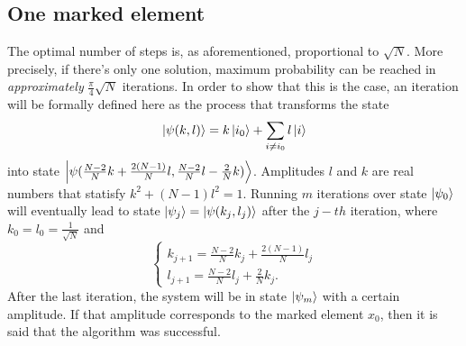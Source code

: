 \documentclass[../../dissertation.tex]{subfiles}
\begin{document}
\subsection{One marked element}
The optimal number of steps is, as aforementioned, proportional to $\sqrt{N}$.
More precisely, if there's only one solution, maximum probability can be
reached in \textit{approximately} $\frac{\pi}{4}\sqrt{N}$ iterations. In order
to show that this is the case, an iteration will be formally defined here as
the process that transforms the state
\begin{equation}
	\ket{\psi(k,l)} = k\ket{i_0} + \sum_{i\neq i_0}l\ket{i}
	\label{eq:groverQuantumRegister}
\end{equation}
into state $\ket{\psi(\frac{N-2}{N}k + \frac{2(N-1)}{N}l, \frac{N-2}{N}l -
\frac{2}{N}k)}$. Amplitudes $l$ and $k$ are real numbers that statisfy $k^2 +
(N-1)l^2=1$. Running $m$ iterations over state $\ket{\psi_0}$ will eventually
lead to state $\ket{\psi_j} = \ket{\psi(k_j,l_j)}$ after the $j-th$ iteration,
where $k_0 = l_0 = \frac{1}{\sqrt{N}}$ and
\begin{equation}
	\begin{cases}
		k_{j+1} = \frac{N-2}{N}k_j + \frac{2(N-1)}{N}l_j
		\\l_{j+1} = \frac{N-2}{N}l_j + \frac{2}{N}k_j.
	\end{cases}\label{eq:groverKandJ1}
\end{equation}
After the last iteration, the system will be in state $\ket{\psi_m}$ with a
certain amplitude. If that amplitude corresponds to the marked element $x_0$,
then it is said that the algorithm was successful.\par 
\end{document}
